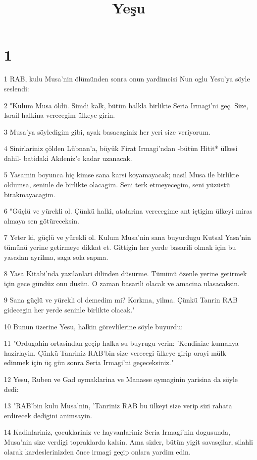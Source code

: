 

\title{Yeşu}


\chapter{1}

\par 1 RAB, kulu Musa'nin ölümünden sonra onun yardimcisi Nun oglu Yesu'ya söyle seslendi:
\par 2 "Kulum Musa öldü. Simdi kalk, bütün halkla birlikte Seria Irmagi'ni geç. Size, Israil halkina verecegim ülkeye girin.
\par 3 Musa'ya söyledigim gibi, ayak basacaginiz her yeri size veriyorum.
\par 4 Sinirlariniz çölden Lübnan'a, büyük Firat Irmagi'ndan -bütün Hitit* ülkesi dahil- batidaki Akdeniz'e kadar uzanacak.
\par 5 Yasamin boyunca hiç kimse sana karsi koyamayacak; nasil Musa ile birlikte oldumsa, seninle de birlikte olacagim. Seni terk etmeyecegim, seni yüzüstü birakmayacagim.
\par 6 "Güçlü ve yürekli ol. Çünkü halki, atalarina verecegime ant içtigim ülkeyi miras almaya sen götüreceksin.
\par 7 Yeter ki, güçlü ve yürekli ol. Kulum Musa'nin sana buyurdugu Kutsal Yasa'nin tümünü yerine getirmeye dikkat et. Gittigin her yerde basarili olmak için bu yasadan ayrilma, saga sola sapma.
\par 8 Yasa Kitabi'nda yazilanlari dilinden düsürme. Tümünü özenle yerine getirmek için gece gündüz onu düsün. O zaman basarili olacak ve amacina ulasacaksin.
\par 9 Sana güçlü ve yürekli ol demedim mi? Korkma, yilma. Çünkü Tanrin RAB gidecegin her yerde seninle birlikte olacak."
\par 10 Bunun üzerine Yesu, halkin görevlilerine söyle buyurdu:
\par 11 "Ordugahin ortasindan geçip halka su buyrugu verin: 'Kendinize kumanya hazirlayin. Çünkü Tanriniz RAB'bin size verecegi ülkeye girip orayi mülk edinmek için üç gün sonra Seria Irmagi'ni geçeceksiniz."
\par 12 Yesu, Ruben ve Gad oymaklarina ve Manasse oymaginin yarisina da söyle dedi:
\par 13 "RAB'bin kulu Musa'nin, 'Tanriniz RAB bu ülkeyi size verip sizi rahata erdirecek dedigini animsayin.
\par 14 Kadinlariniz, çocuklariniz ve hayvanlariniz Seria Irmagi'nin dogusunda, Musa'nin size verdigi topraklarda kalsin. Ama sizler, bütün yigit savasçilar, silahli olarak kardeslerinizden önce irmagi geçip onlara yardim edin.
